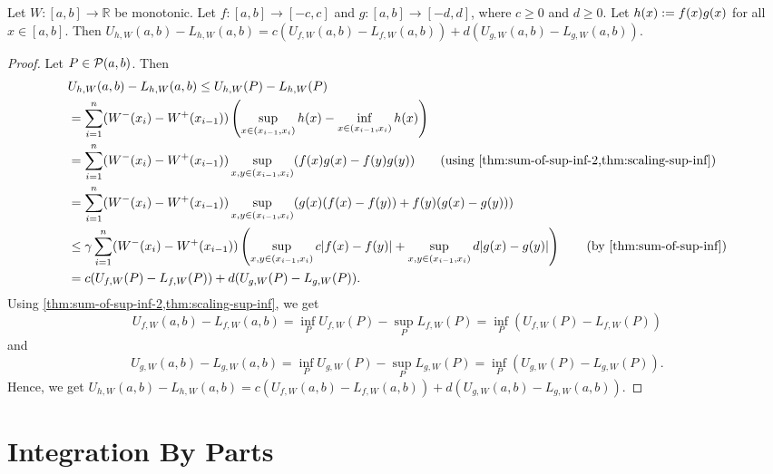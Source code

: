 \documentclass[a4paper,12pt,fleqn]{article}
\begin{document}
\begin{lemma}
\label{thm:dint:prod}
Let $W: [a, b] \to \mathbb{R}$ be monotonic.
Let $f: [a, b] \to [-c, c]$ and $g: [a, b] \to [-d, d]$,
where $c \ge 0$ and $d \ge 0$.
Let $h(x) := f(x)g(x)$ for all $x \in [a, b]$. Then
$U_{h,W}(a, b) - L_{h,W}(a, b) = c(U_{f,W}(a, b) - L_{f,W}(a, b)) + d(U_{g,W}(a, b) - L_{g,W}(a, b))$.
\end{lemma}
\begin{proof}
Let $P \in \mathcal{P}(a, b)$. Then
\begin{align*}
& U_{h,W}(a, b) - L_{h,W}(a, b) \le U_{h,W}(P) - L_{h,W}(P)
\\ &= \sum_{i=1}^n (W^-(x_i) - W^+(x_{i-1}))
    \left(\sup_{x \in (x_{i-1}, x_i)} h(x) - \inf_{x \in (x_{i-1}, x_i)} h(x)\right)
\\ &= \sum_{i=1}^n (W^-(x_i) - W^+(x_{i-1}))
    \sup_{x, y \in (x_{i-1}, x_i)} (f(x)g(x) - f(y)g(y))
    \tag{using \cref{thm:sum-of-sup-inf-2,thm:scaling-sup-inf}}
\\ &= \sum_{i=1}^n (W^-(x_i) - W^+(x_{i-1}))
    \sup_{x, y \in (x_{i-1}, x_i)} (g(x)(f(x) - f(y)) + f(y)(g(x) - g(y)))
\\ &\le \gamma\sum_{i=1}^n (W^-(x_i) - W^+(x_{i-1}))
    \left(\sup_{x, y \in (x_{i-1}, x_i)} c|f(x) - f(y)|
        + \sup_{x, y \in (x_{i-1}, x_i)} d|g(x) - g(y)|\right)
    \tag{by \cref{thm:sum-of-sup-inf}}
\\ &= c(U_{f,W}(P) - L_{f,W}(P)) + d(U_{g,W}(P) - L_{g,W}(P)).
\end{align*}
Using \cref{thm:sum-of-sup-inf-2,thm:scaling-sup-inf}, we get
\[ U_{f,W}(a, b) - L_{f,W}(a, b) = \inf_P U_{f,W}(P) - \sup_P L_{f,W}(P)
= \inf_P (U_{f,W}(P) - L_{f,W}(P)) \]
and
\[ U_{g,W}(a, b) - L_{g,W}(a, b) = \inf_P U_{g,W}(P) - \sup_P L_{g,W}(P)
= \inf_P (U_{g,W}(P) - L_{g,W}(P)). \]
Hence, we get
$U_{h,W}(a, b) - L_{h,W}(a, b) = c(U_{f,W}(a, b) - L_{f,W}(a, b)) + d(U_{g,W}(a, b) - L_{g,W}(a, b))$.
\end{proof}

\section{Integration By Parts}
\end{document}

